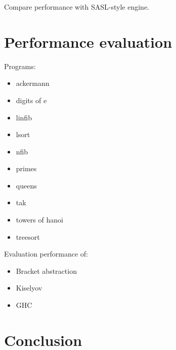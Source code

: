 \documentclass[conference]{IEEEtran}
\begin{document}
Compare performance with SASL-style engine.

\section{Performance evaluation}
\label{sec:eval}
Programs:
\begin{itemize}
    \item ackermann
    \item digits of e
    \item linfib
    \item lsort
    \item nfib
    \item primes
    \item queens
    \item tak
    \item towers of hanoi
    \item treesort
\end{itemize}

Evaluation performance of:

\begin{itemize}
    \item Bracket abstraction
    \item Kiselyov
    \item GHC
\end{itemize}

\section{Conclusion}








\end{document}
